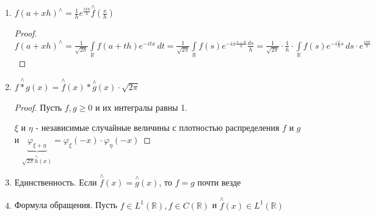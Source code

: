 \begin{properties}
\begin{enumerate}
{            Тогда $\overset{\wedge}{f}^{(k)} (x) = (ix)^k \overset{\wedge}{f} (x)$

            \begin{proof}
                Надо доказать, что $\overset{\wedge}{f'} (x) = ix \cdot \overset{\wedge}{f} (x)$

                $\overset{\wedge}{f'} (x) = \frac{1}{\sqrt{2\pi}} \int\limits_{\mathbb{R}} f'(t) e^{-itx} \, dt = \frac{1}{\sqrt{2\pi}} f(t) e^{-itx} \bigg |_{t = -\infty}^{t = +\infty} + ix \cdot \underbrace{\frac{1}{\sqrt{2\pi}} \int\limits_{\mathbb{R}} f(t) e^{-itx} \, dt}_{=\overset{\wedge}{f} (x)}$

                $f(t) = \int\limits_0^t f' (s) \, ds \rightarrow_{t \to +\infty} \int\limits_0^\infty f' (s) \, ds \implies \lim\limits_{t \to \pm \infty} f(t)$ существует
                
                Если $a = \lim\limits_{t \to + \infty} f(t) \neq 0 \implies |f(t)| > \frac{|a|}{2}$ при больших $t$, а тогда нет суммируемости. Значит пределы нули и неинтегрального слагаемого у нас нет
            \end{proof}
        }
        \item {
            $f(a + xh)^{\wedge} = \frac{1}{h} e^{\frac{ixa}{h}} \overset{\wedge}{f} (\frac{x}{h})$

            \begin{proof}
                $f(a + xh)^{\wedge} = \frac{1}{\sqrt{2\pi}} \int\limits_{\mathbb{R}} f(a + th) e^{-itx} \, dt = \frac{1}{\sqrt{2\pi}} \int\limits_{\mathbb{R}} f(s) e^{-ix \frac{s - a}{h}} \frac{ds}{h} = \frac{1}{\sqrt{2\pi}} \cdot \frac{1}{h} \cdot \int\limits_{\mathbb{R}} f(s) e^{-i \frac{x}{h} s} \, ds \cdot e^{\frac{ixa}{h}}$
            \end{proof}
        }
        \item {
            $\overset{\wedge}{f * g} (x) = \overset{\wedge}{f} (x) * \overset{\wedge}{g} (x) \cdot \sqrt{2\pi}$

            \begin{proof}
                Пусть $f, g \geqslant 0$ и их интегралы равны 1.

                $\xi$ и $\eta$ - независимые случайные величины с плотностью распределения $f$ и $g$ и $\underbrace{\varphi_{\xi + \eta}}_{\sqrt{2\pi} \overset{\wedge}{h} (x)} = \varphi_{\xi} (-x) \cdot \varphi_{\eta} (-x)$
            \end{proof}
        }
        \item {
            Единственность. Если $\overset{\wedge}{f} (x) = \overset{\wedge}{g} (x)$, то $f = g$ почти везде
        }
        \item {
            Формула обращения. Пусть $f \in L^1 (\mathbb{R}), f \in C(\mathbb{R})$ и $\overset{\wedge}{f} (x) \in L^1 (\mathbb{R})$

}
\end{enumerate}
\end{properties}
